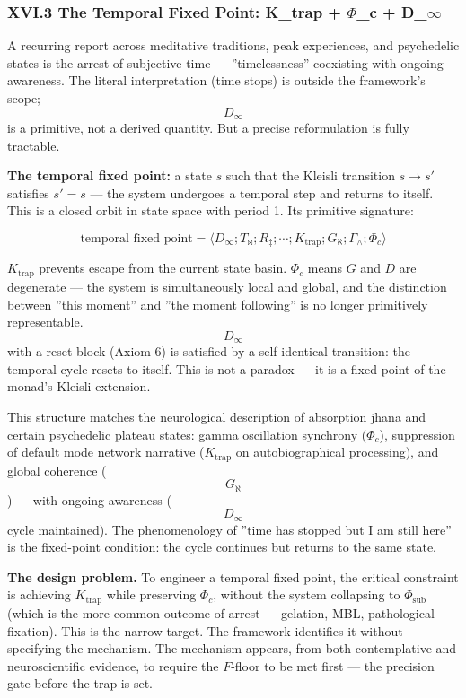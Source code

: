 \documentclass[12pt,a4paper]{article}
\begin{document}
\subsubsection{XVI.3 The Temporal Fixed Point: K\_trap + $\Phi$\_c + D\_$\infty$}

A recurring report across meditative traditions, peak experiences, and psychedelic states is the arrest of subjective time --- ''timelessness'' coexisting with ongoing awareness. The literal interpretation (time stops) is outside the framework's scope; $$D_{\infty}$$ is a primitive, not a derived quantity. But a precise reformulation is fully tractable.

\textbf{The temporal fixed point:} a state $s$ such that the Kleisli transition $s \to s'$ satisfies $s' = s$ --- the system undergoes a temporal step and returns to itself. This is a closed orbit in state space with period 1. Its primitive signature:

\[\text{temporal fixed point} = \langle D_\infty ; T_\bowtie ; R_\ddagger ; \cdots ; K_\text{trap} ; G_\aleph ; \Gamma_\wedge ; \Phi_c \rangle\]

$K_\text{trap}$ prevents escape from the current state basin. $\Phi_c$ means $G$ and $D$ are degenerate --- the system is simultaneously local and global, and the distinction between ''this moment'' and ''the moment following'' is no longer primitively representable. $$D_{\infty}$$ with a reset block (Axiom 6) is satisfied by a self-identical transition: the temporal cycle resets to itself. This is not a paradox --- it is a fixed point of the monad's Kleisli extension.

This structure matches the neurological description of absorption jhana and certain psychedelic plateau states: gamma oscillation synchrony ($\Phi_c$), suppression of default mode network narrative ($K_\text{trap}$ on autobiographical processing), and global coherence ($$G_{\aleph}$$) --- with ongoing awareness ($$D_{\infty}$$ cycle maintained). The phenomenology of ''time has stopped but I am still here'' is the fixed-point condition: the cycle continues but returns to the same state.

\textbf{The design problem.} To engineer a temporal fixed point, the critical constraint is achieving $K_\text{trap}$ while preserving $\Phi_c$, without the system collapsing to $\Phi_\text{sub}$ (which is the more common outcome of arrest --- gelation, MBL, pathological fixation). This is the narrow target. The framework identifies it without specifying the mechanism. The mechanism appears, from both contemplative and neuroscientific evidence, to require the $F$-floor to be met first --- the precision gate before the trap is set.
\end{document}
